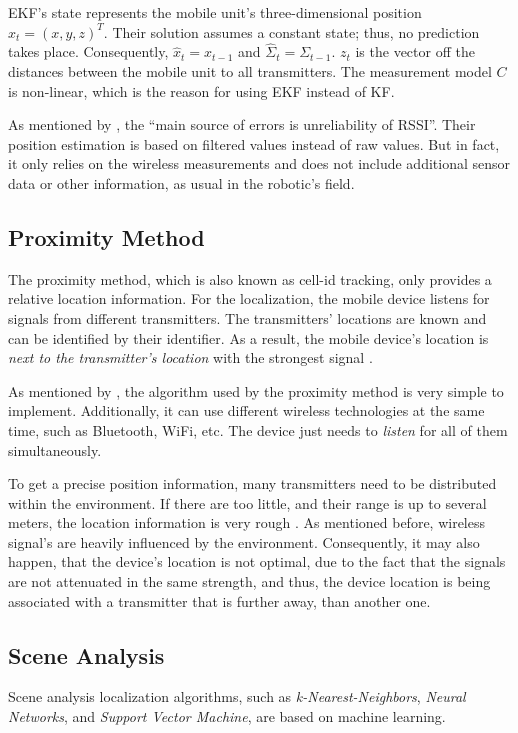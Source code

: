 \ac{EKF}'s state represents the mobile unit's three-dimensional position $x_t = (x, y, z)^T$. Their solution assumes a constant state; thus, no prediction takes place. Consequently, $\hat{x}_t = x_{t-1}$ and $\hat{\Sigma}_t = \Sigma_{t-1}$. $z_t$ is the vector off the distances between the mobile unit to all transmitters. The measurement model $C$ is non-linear, which is the reason for using \ac{EKF} instead of \ac{KF}.

As mentioned by \citet{kotanen:exp_local_pos_bt}, the ``main source of errors is unreliability of \ac{RSSI}''. Their position estimation is based on filtered values instead of raw values. But in fact, it only relies on the wireless measurements and does not include additional sensor data or other information, as usual in the robotic's field.


\subsection{Proximity Method}
The proximity method, which is also known as cell-id tracking, only provides a relative location information. For the localization, the mobile device listens for signals from different transmitters. The transmitters' locations are known and can be identified by their identifier. As a result, the mobile device's location is \emph{next to the transmitter's location} with the strongest signal \citep{IEEE:survey_wireless_indoor_pos, wang:bt_pos}.

As mentioned by \citet{IEEE:survey_wireless_indoor_pos}, the algorithm used by the proximity method is very simple to implement. Additionally, it can use different wireless technologies at the same time, such as Bluetooth, WiFi, etc. The device just needs to \emph{listen} for all of them simultaneously. 

To get a precise position information, many transmitters need to be distributed within the environment. If there are too little, and their range is up to several meters, the location information is very rough \citep{kotanen:exp_local_pos_bt}. As mentioned before, wireless signal's are heavily influenced by the environment. Consequently, it may also happen, that the device's location is not optimal, due to the fact that the signals are not attenuated in the same strength, and thus, the device location is being associated with a transmitter that is further away, than another one.


\subsection{Scene Analysis}\label{sec:fund_sceneanalysis}
Scene analysis localization algorithms, such as \emph{k-Nearest-Neighbors}, \emph{Neural Networks}, and \emph{Support Vector Machine}, are based on machine learning.

